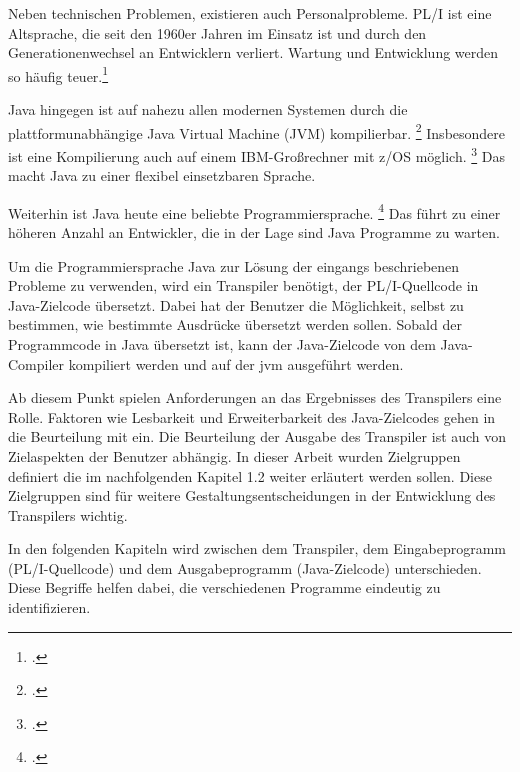 Neben technischen Problemen, existieren auch Personalprobleme. PL/I ist eine Altsprache, die seit den 1960er Jahren im Einsatz ist und durch den Generationenwechsel an Entwicklern verliert. Wartung und Entwicklung werden so häufig teuer.\footcite[Vgl. ][S. 227ff.]{histopli} 

Java hingegen ist auf nahezu allen modernen Systemen durch die plattformunabhängige Java Virtual Machine (JVM) kompilierbar. \footcite[Vgl. ][]{jvm}
Insbesondere ist eine Kompilierung auch auf einem IBM-Großrechner mit z/OS möglich. \footcite[Vgl. ][]{zos} 
Das macht Java zu einer flexibel einsetzbaren Sprache. 

Weiterhin ist Java heute eine beliebte Programmiersprache. \footcite[Vgl. ][]{tiobe} Das führt zu einer höheren Anzahl an Entwickler, die in der Lage sind Java Programme zu warten.

Um die Programmiersprache Java zur Lösung der eingangs beschriebenen Probleme zu verwenden, wird ein Transpiler benötigt, der PL/I-Quellcode in Java-Zielcode übersetzt. Dabei hat der Benutzer die Möglichkeit, selbst zu bestimmen, wie bestimmte Ausdrücke übersetzt werden sollen. Sobald der Programmcode in Java übersetzt ist, kann der Java-Zielcode von dem Java-Compiler kompiliert werden und auf der \ac{jvm} ausgeführt werden.

Ab diesem Punkt spielen Anforderungen an das Ergebnisses des Transpilers eine Rolle. Faktoren wie Lesbarkeit und Erweiterbarkeit des Java-Zielcodes gehen in die Beurteilung mit ein. 
Die Beurteilung der Ausgabe des Transpiler ist auch von Zielaspekten der Benutzer abhängig. In dieser Arbeit wurden Zielgruppen definiert die im nachfolgenden Kapitel 1.2 weiter erläutert werden sollen. Diese Zielgruppen sind für weitere Gestaltungsentscheidungen in der Entwicklung des Transpilers wichtig.

In den folgenden Kapiteln wird zwischen dem Transpiler, dem Eingabeprogramm (PL/I-Quellcode) und dem Ausgabeprogramm (Java-Zielcode) unterschieden. Diese Begriffe helfen dabei, die verschiedenen Programme eindeutig zu identifizieren.


     


